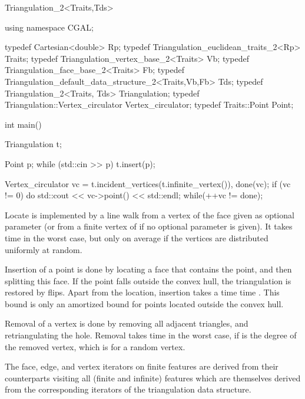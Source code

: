 \begin{ccClassTemplate}{Triangulation_2<Traits,Tds>}
\begin{cprog}
using namespace CGAL;

typedef Cartesian<double> Rp;
typedef Triangulation_euclidean_traits_2<Rp> Traits;
typedef Triangulation_vertex_base_2<Traits> Vb;
typedef Triangulation_face_base_2<Traits>  Fb;
typedef Triangulation_default_data_structure_2<Traits,Vb,Fb> Tds;
typedef Triangulation_2<Traits, Tds> Triangulation;
typedef Triangulation::Vertex_circulator Vertex_circulator;
typedef Traits::Point   Point;

int main() {
  Triangulation t;
    
  Point p;
  while (std::cin >> p){
    t.insert(p);
  }
  
  Vertex_circulator vc = t.incident_vertices(t.infinite_vertex()),
    done(vc);
  if (vc != 0) {
    do{
      std::cout << vc->point() << std::endl;
    }while(++vc != done);
  }
}
\end{cprog} 


Locate is implemented by a line walk from a vertex of the face given
as optional parameter (or from a finite vertex of
 if no optional parameter is given). It takes
time  in the worst case, but only 
on average if the vertices are distributed uniformly at random.

Insertion of a point is done by locating a face that contains the
point, and then splitting this face.
If the point falls outside the convex hull, the triangulation
 is restored by flips.  Apart from the location, insertion takes a time 
time . This bound is only an amortized bound
for points located outside the convex hull.

Removal of a vertex is done by removing all adjacent triangles, and
retriangulating the hole. Removal takes time  in the worst
case, if  is the degree of the removed vertex,
which is  for a random vertex.

The face, edge, and vertex iterators on finite features
are derived from their counterparts visiting all (finite and infinite)
features which are themselves derived from the corresponding iterators
of the triangulation data structure.

\end{ccClassTemplate}


